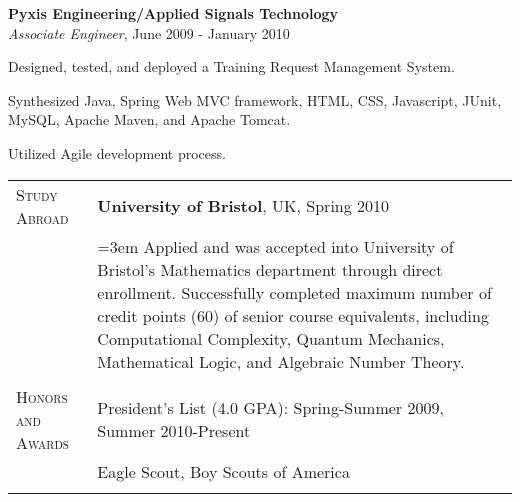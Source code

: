 \atab \textbf{Pyxis Engineering/Applied Signals Technology}\\
\btab \textit{Associate Engineer}, June 2009 - January 2010\\
\begin{my_list}
\item Designed, tested, and deployed a Training Request Management System.
\item Synthesized Java, Spring Web MVC framework, HTML, CSS, Javascript, JUnit,\\ \tab \tab MySQL, Apache Maven, and Apache Tomcat.
\item Utilized Agile development process.
\end{my_list}
\medskip

\begin{tabular}{l p{340pt}}

\textsc{Study Abroad} & \textbf{University of Bristol}, UK, Spring 2010\\
& \hangindent=3em \hangafter=0  Applied and was accepted into University of Bristol's Mathematics department through direct enrollment.  Successfully completed maximum number of credit points (60) of senior course equivalents, including Computational Complexity, Quantum Mechanics, Mathematical Logic, and Algebraic Number Theory.\\
& \\

\textsc{Honors and Awards} & President's List (4.0 GPA): Spring-Summer 2009, Summer 2010-Present\\
& Eagle Scout, Boy Scouts of America\\
& \\



\end{tabular}
